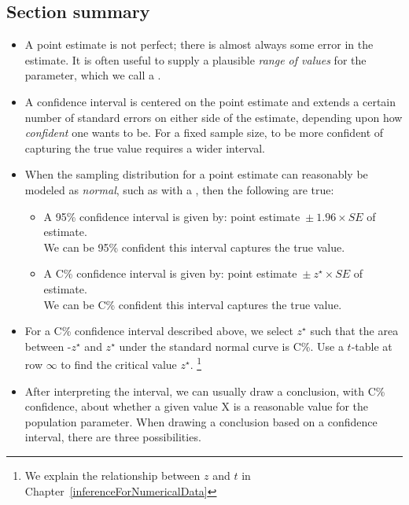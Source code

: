 \subsection*{Section summary}
\begin{itemize}
\item A point estimate is not perfect; there is almost always some error in the estimate. It is often useful to supply a plausible \textit{range of values} for the parameter, which we call a .  

\item A confidence interval is centered on the point estimate and extends a certain number of standard errors on either side of the estimate, depending upon how \textit{confident} one wants to be.  For a fixed sample size, to be more confident of capturing the true value requires a wider interval.


\item When the sampling distribution for a point estimate can reasonably be modeled as
\emph{normal}, such as with a , then the following are true:\vspace{-1mm}
\begin{itemize}
\item A 95\% confidence interval is given by:   point estimate\ $\pm\ 1.96 \times SE$ of estimate.
\\We can be 95\% confident this interval captures the true value.
\item A C\% confidence interval is given by:   point estimate\ $\pm\ z^{\star} \times SE$ of estimate.  
\\We can be C\% confident this interval captures the true value.
\end{itemize}

\item For a C\% confidence interval described above, we select $z^{\star}$ such that the area between -$z^{\star}$ and $z^{\star}$ under the standard normal curve is C\%. Use a $t$-table at row $\infty$ to find the critical value $z^{\star}$. \footnote{We explain the relationship between $z$ and $t$ in Chapter~\ref{inferenceForNumericalData}}

\item After interpreting the interval, we can usually draw a conclusion, with C\% confidence, about whether a given value X is a reasonable value for the population parameter.  When drawing a conclusion based on a confidence interval, there are three  possibilities.  


\end{itemize}

